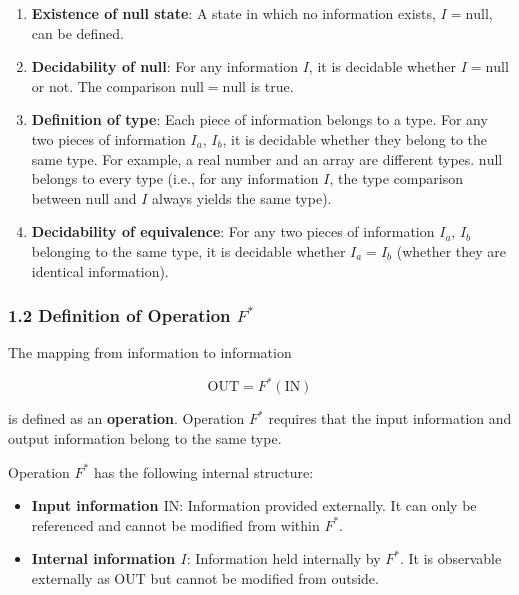 \documentclass[a4paper,11pt]{article}
\providecommand{\tightlist}{\setlength{\itemsep}{0pt}\setlength{\parskip}{0pt}}
\begin{document}
\begin{enumerate}
\def\labelenumi{\arabic{enumi}.}
\tightlist
\item
  \textbf{Existence of null state}: A state in which no information
  exists, \(I = \mathrm{null}\), can be defined.
\item
  \textbf{Decidability of null}: For any information \(I\), it is
  decidable whether \(I = \mathrm{null}\) or not. The comparison
  \(\mathrm{null} = \mathrm{null}\) is true.
\item
  \textbf{Definition of type}: Each piece of information belongs to a
  type. For any two pieces of information \(I_a,\, I_b\), it is
  decidable whether they belong to the same type. For example, a real
  number and an array are different types. \(\mathrm{null}\) belongs to
  every type (i.e., for any information \(I\), the type comparison
  between \(\mathrm{null}\) and \(I\) always yields the same type).
\item
  \textbf{Decidability of equivalence}: For any two pieces of
  information \(I_a,\, I_b\) belonging to the same type, it is decidable
  whether \(I_a = I_b\) (whether they are identical information).
\end{enumerate}

\subsubsection{\texorpdfstring{1.2 Definition of Operation
\(F^*\)}{1.2 Definition of Operation F\^{}*}}\label{definition-of-operation-f}

The mapping from information to information

\[
\mathrm{OUT} = F^*(\mathrm{IN})
\]

is defined as an \textbf{operation}. Operation \(F^*\) requires that the
input information and output information belong to the same type.

Operation \(F^*\) has the following internal structure:

\begin{itemize}
\tightlist
\item
  \textbf{Input information \(\mathrm{IN}\)}: Information provided
  externally. It can only be referenced and cannot be modified from
  within \(F^*\).
\item
  \textbf{Internal information \(I\)}: Information held internally by
  \(F^*\). It is observable externally as \(\mathrm{OUT}\) but cannot be
  modified from outside.
\end{itemize}
\end{document}
